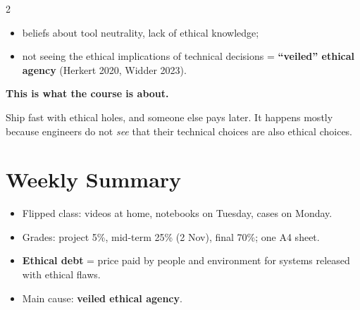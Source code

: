 \documentclass[a4paper,9pt]{extarticle}
\begin{document}
\begin{multicols}{2}
\begin{important}
\begin{itemize}
\item beliefs about tool neutrality, lack of ethical knowledge;

\item not seeing the ethical implications of technical decisions = \textbf{``veiled''
ethical agency} (Herkert 2020, Widder 2023).

\end{itemize}

\textbf{This is what the course is about.}

\end{important}


\begin{goat}

Ship fast with ethical holes, and someone else pays later. It happens mostly because engineers
do not \emph{see} that their technical choices are also ethical choices.

\end{goat}



\section{Weekly Summary}


\begin{summary}

\begin{itemize}

\item Flipped class: videos at home, notebooks on Tuesday, cases on Monday.

\item Grades: project 5\%, mid-term 25\% (2 Nov), final 70\%; one A4 sheet.

\item \textbf{Ethical debt} = price paid by people and environment for systems released with
ethical flaws.

\item Main cause: \textbf{veiled ethical agency}.

\end{itemize}

\end{summary}


\end{multicols}
\end{document}
